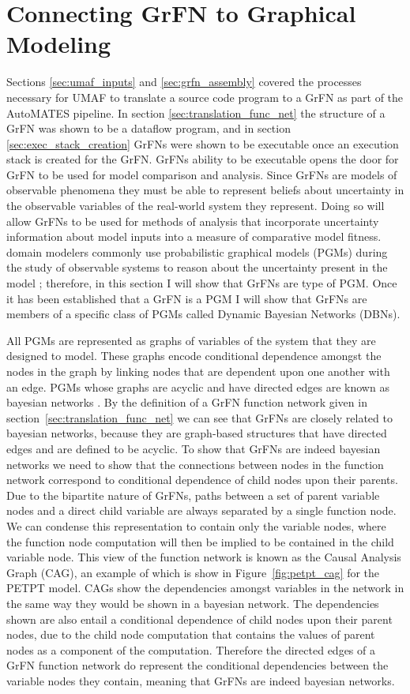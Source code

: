 \section{Connecting GrFN to Graphical Modeling\label{sec:grfns_are_pgms}}
Sections \ref{sec:umaf_inputs} and \ref{sec:grfn_assembly} covered the processes necessary for UMAF to translate a source code program to a GrFN as part of the AutoMATES pipeline.
In section \ref{sec:translation_func_net} the structure of a GrFN was shown to be a dataflow program, and in section \ref{sec:exec_stack_creation} GrFNs were shown to be executable once an execution stack is created for the GrFN.
GrFNs ability to be executable opens the door for GrFN to be used for model comparison and analysis.
Since GrFNs are models of observable phenomena they must be able to represent beliefs about uncertainty in the observable variables of the real-world system they represent.
Doing so will allow GrFNs to be used for methods of analysis that incorporate uncertainty information about model inputs into a measure of comparative model fitness.
domain modelers commonly use probabilistic graphical models (PGMs) during the study of observable systems to reason about the uncertainty present in the model \citep{pearl2014probabilistic}; therefore, in this section I will show that GrFNs are type of PGM.
Once it has been established that a GrFN is a PGM I will show that GrFNs are members of a specific class of PGMs called Dynamic Bayesian Networks (DBNs).

All PGMs are represented as graphs of variables of the system that they are designed to model.
These graphs encode conditional dependence amongst the nodes in the graph by linking nodes that are dependent upon one another with an edge.
PGMs whose graphs are acyclic and have directed edges are known as bayesian networks \citep{bishop2006pattern}.
By the definition of a GrFN function network given in section~\ref{sec:translation_func_net} we can see that GrFNs are closely related to bayesian networks, because they are graph-based structures that have directed edges and are defined to be acyclic.
To show that GrFNs are indeed bayesian networks we need to show that the connections between nodes in the function network correspond to conditional dependence of child nodes upon their parents.
Due to the bipartite nature of GrFNs, paths between a set of parent variable nodes and a direct child variable are always separated by a single function node.
We can condense this representation to contain only the variable nodes, where the function node computation will then be implied to be contained in the child variable node.
This view of the function network is known as the Causal Analysis Graph (CAG), an example of which is show in Figure~\ref{fig:petpt_cag} for the PETPT model.
CAGs show the dependencies amongst variables in the network in the same way they would be shown in a bayesian network.
The dependencies shown are also entail a conditional dependence of child nodes upon their parent nodes, due to the child node computation that contains the values of parent nodes as a component of the computation.
Therefore the directed edges of a GrFN function network do represent the conditional dependencies between the variable nodes they contain, meaning that GrFNs are indeed bayesian networks.

